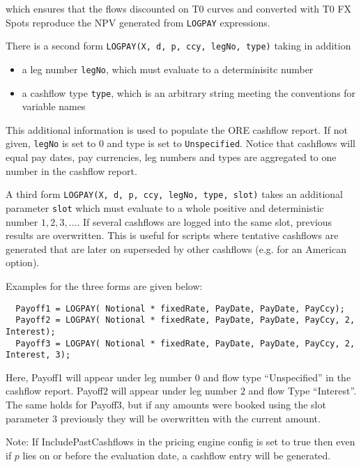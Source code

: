 which ensures that the flows discounted on T0 curves and converted with T0 FX Spots reproduce the NPV generated from
\verb+LOGPAY+ expressions.

There is a second form {\tt LOGPAY(X, d, p, ccy, legNo, type)} taking in addition

\begin{itemize}
\item a leg number \verb+legNo+, which must evaluate to a determinisitc number
\item a cashflow type \verb+type+, which is an arbitrary string meeting the conventions for variable names
\end{itemize}

This additional information is used to populate the ORE cashflow report. If not given, \verb+legNo+ is set to $0$ and
type is set to \verb+Unspecified+. Notice that cashflows will equal pay dates, pay currencies, leg numbers and types are
aggregated to one number in the cashflow report.

A third form {\tt LOGPAY(X, d, p, ccy, legNo, type, slot)} takes an additional parameter \verb+slot+ which must evaluate
to a whole positive and deterministic number $1,2,3,\ldots$. If several cashflows are logged into the same slot,
previous results are overwritten. This is useful for scripts where tentative cashflows are generated that are later on
superseded by other cashflows (e.g. for an American option).

Examples for the three forms are given below:

\begin{verbatim}
  Payoff1 = LOGPAY( Notional * fixedRate, PayDate, PayDate, PayCcy);
  Payoff2 = LOGPAY( Notional * fixedRate, PayDate, PayDate, PayCcy, 2, Interest);
  Payoff3 = LOGPAY( Notional * fixedRate, PayDate, PayDate, PayCcy, 2, Interest, 3);
\end{verbatim}

Here, Payoff1 will appear under leg number $0$ and flow type ``Unspecified'' in the cashflow report. Payoff2 will appear
under leg number $2$ and flow Type ``Interest''. The same holds for Payoff3, but if any amounts were booked using the
slot parameter $3$ previously they will be overwritten with the current amount.

Note: If IncludePastCashflows in the pricing engine config is set to true then even if $p$ lies on or before the
evaluation date, a cashflow entry will be generated.

\label{function_npv}


